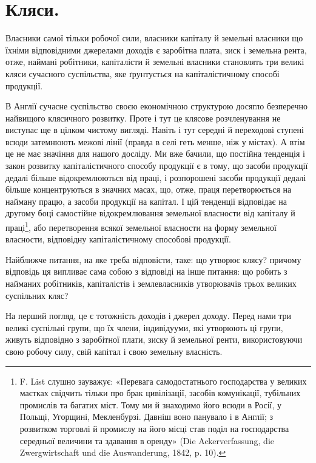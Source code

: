 
\section{Кляси.}

Власники самої тільки робочої сили, власники капіталу й земельні власники
що їхніми відповідними джерелами доходів є заробітна плата, зиск і земельна рента,
отже, наймані робітники, капіталісти й земельні власники становлять три великі
кляси сучасного суспільства, яке ґрунтується на капіталістичному способі
продукції.

В Англії сучасне суспільство своєю економічною структурою досягло безперечно
найвищого клясичного розвитку. Проте і тут це клясове розчленування не
виступає ще в цілком чистому вигляді. Навіть і тут середні й переходові ступені
всюди затемнюють межові лінії (правда в селі геть менше, ніж у містах).
А втім це не має значіння для нашого досліду. Ми вже бачили, що постійна
тенденція і закон розвитку капіталістичного способу продукції є в тому, що
засоби продукції дедалі більше відокремлюються від праці, і розпорошені засоби
продукції дедалі більше концентруються в значних масах, що, отже, праця
перетворюється на найману працю, а засоби продукції на капітал. І цій тенденції
відповідає на другому боці самостійне відокремлювання земельної власности
від капіталу й праці\footnote{
F. List слушно зауважує: «Перевага самодостатнього господарства у великих маєтках
свідчить тільки про брак цивілізації, засобів комунікації, тубільних промислів та багатих міст. Тому
ми й знаходимо його всюди в Росії, у Польщі, Угорщині, Мекленбурзі. Давніш воно панувало і в Англії;
з розвитком торговлі й промислу на його місці став поділ на господарства середньої величини та
здавання в оренду» (Die Ackerverfassung, die Zwergwirtschaft und die Auswanderung, 1842, p. 10).
}, або перетворення всякої земельної власности на форму
земельної власности, відповідну капіталістичному способові продукції.

Найближче питання, на яке треба відповісти, таке: що утворює клясу?
причому відповідь ця випливає сама собою з відповіді на інше питання: що
робить з найманих робітників, капіталістів і землевласників утворювачів трьох
великих суспільних кляс?

На перший погляд, це є тотожність доходів і джерел доходу. Перед нами
три великі суспільні групи, що їх члени, індивідууми, які утворюють ці групи,
живуть відповідно з заробітної плати, зиску й земельної ренти, використовуючи
свою робочу силу, свій капітал і свою земельну власність.

